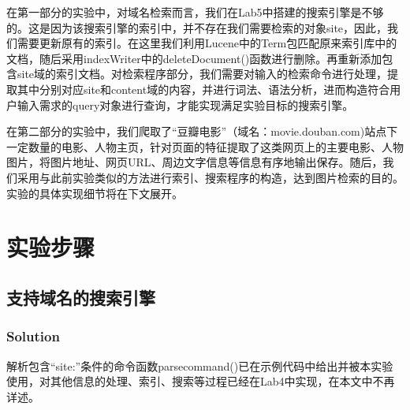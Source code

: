 \documentclass{article}
\begin{document}
在第一部分的实验中，对域名检索而言，我们在Lab5中搭建的搜索引擎是不够的。这是因为该搜索引擎的索引中，并不存在我们需要检索的对象site，因此，我们需要更新原有的索引。在这里我们利用Lucene中的Term包匹配原来索引库中的文档，随后采用indexWriter中的deleteDocument()函数进行删除。再重新添加包含site域的索引文档。对检索程序部分，我们需要对输入的检索命令进行处理，提取其中分别对应site和content域的内容，并进行词法、语法分析，进而构造符合用户输入需求的query对象进行查询，才能实现满足实验目标的搜索引擎。

在第二部分的实验中，我们爬取了“豆瓣电影”（域名：movie.douban.com)站点下一定数量的电影、人物主页，针对页面的特征提取了这类网页上的主要电影、人物图片，将图片地址、网页URL、周边文字信息等信息有序地输出保存。随后，我们采用与此前实验类似的方法进行索引、搜索程序的构造，达到图片检索的目的。实验的具体实现细节将在下文展开。


\section{实验步骤}

\subsection{支持域名的搜索引擎}

\subsubsection{Solution}

解析包含“site:”条件的命令函数parsecommand()已在示例代码中给出并被本实验使用，对其他信息的处理、索引、搜索等过程已经在Lab4中实现，在本文中不再详述。
\end{document}
